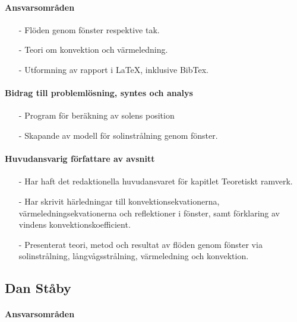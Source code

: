 \documentclass[12pt,a4paper]{article}
\begin{document}
\paragraph{Ansvarsområden}

\begin{itemize}
\item[-] Flöden genom fönster respektive tak.
\item[-] Teori om konvektion och värmeledning.
\item[-] Utformning av rapport i \LaTeX, inklusive BibTex.
\end{itemize}

\paragraph{Bidrag till problemlösning, syntes och analys}

\begin{itemize}
\item[-] Program för beräkning av solens position
\item[-] Skapande av modell för solinstrålning genom fönster.
\end{itemize}

\paragraph{Huvudansvarig författare av avsnitt}

\begin{itemize}
\item[-] Har haft det redaktionella huvudansvaret för kapitlet Teoretiskt ramverk.
\item[-] Har skrivit härledningar till konvektionsekvationerna, värmeledningsekvationerna och reflektioner i fönster, samt förklaring av vindens konvektionskoefficient.
\item[-] Presenterat teori, metod och resultat av flöden genom fönster via solinstrålning, långvågsstrålning, värmeledning och konvektion.
\end{itemize}


\subsection*{Dan Ståby}

\paragraph{Ansvarsområden}
\end{document}
